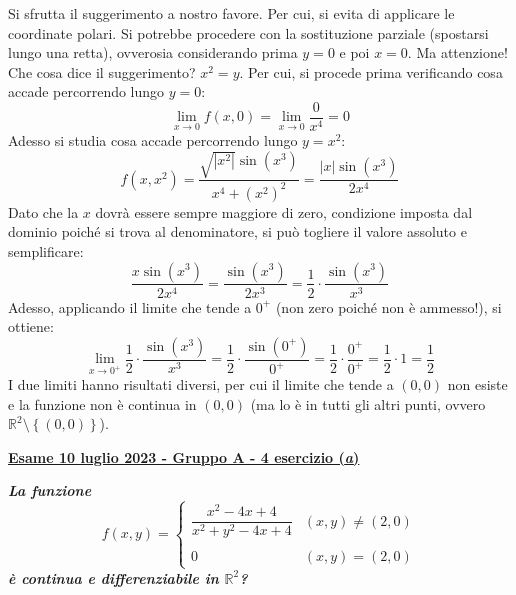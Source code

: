 \documentclass[a4paper]{article}
\newcommand{\definition}[1]{\textcolor{Red3}{\textbf{#1}}}
\newcommand{\example}[1]{\textcolor{Green4}{\textbf{#1}}}
\begin{document}
	\noindent
	Si sfrutta il suggerimento a nostro favore. Per cui, si evita di applicare le coordinate polari. Si potrebbe procedere con la sostituzione parziale (spostarsi lungo una retta), ovverosia considerando prima $y=0$ e poi $x=0$. Ma attenzione! Che cosa dice il suggerimento? $x^{2} = y$. Per cui, si procede prima verificando cosa accade percorrendo lungo $y = 0$:
	\begin{equation*}
		\displaystyle\lim_{x \rightarrow 0} f\left(x,0\right) = \displaystyle\lim_{x \rightarrow 0} \dfrac{0}{x^{4}} = 0
	\end{equation*}
	Adesso si studia cosa accade percorrendo lungo $y = x^{2}$:
	\begin{equation*}
		f\left(x,x^{2}\right) 
		= 
		\dfrac{\sqrt{\left|x^{2}\right|} \sin\left(x^{3}\right)}{x^{4}+\left(x^{2}\right)^{2}}
		=
		\dfrac{\left|x\right| \sin\left(x^{3}\right)}{2x^{4}}
	\end{equation*}
	Dato che la $x$ dovrà essere sempre maggiore di zero, condizione imposta dal dominio poiché si trova al denominatore, si può togliere il valore assoluto e semplificare:
	\begin{equation*}
		\dfrac{x \sin\left(x^{3}\right)}{2x^{4}} = \dfrac{\sin\left(x^{3}\right)}{2x^{3}} = \dfrac{1}{2}\cdot \dfrac{\sin\left(x^{3}\right)}{x^{3}}
	\end{equation*}
	Adesso, applicando il limite che tende a $0^{+}$ (non zero poiché non è ammesso!), si ottiene:
	\begin{equation*}
		\displaystyle\lim_{x \rightarrow 0^{+}} \dfrac{1}{2}\cdot \dfrac{\sin\left(x^{3}\right)}{x^{3}} 
		= 
		\dfrac{1}{2}\cdot \dfrac{\sin\left(0^{+}\right)}{0^{+}} 
		= 
		\dfrac{1}{2} \cdot \dfrac{0^{+}}{0^{+}}
		=
		\dfrac{1}{2} \cdot 1
		=
		\dfrac{1}{2}
	\end{equation*}
	I due limiti hanno risultati diversi, per cui il limite che tende a $\left(0,0\right)$ non esiste e la funzione non è continua in $\left(0,0\right)$ (ma lo è in tutti gli altri punti, ovvero $\mathbb{R}^{2} \setminus \left\{\left(0,0\right)\right\}$).

	\newpage

	\begin{flushleft}
		\label{exam: esame 10 luglio 2023 - Gruppo A - 4 esercizio (a)}
		\hypertarget{
			exam: esame 10 luglio 2023 - Gruppo A - 4 esercizio (a)
		}{
			\definition{\underline{Esame 10 luglio 2023 - Gruppo A - 4 esercizio (\emph{a})}}
		}
	\end{flushleft}
	\example{\emph{La funzione}
	\begin{equation*}
		f\left(x,y\right) = \begin{cases}
			\dfrac{x^{2} - 4x + 4}{x^{2}+y^{2}-4x +4} & \left(x,y\right) \ne \left(2,0\right) \\
			\\
			0 & \left(x,y\right) = \left(2,0\right)
		\end{cases}
	\end{equation*}
	\emph{è continua e differenziabile in $\mathbb{R}^{2}$?}}\newline
\end{document}
